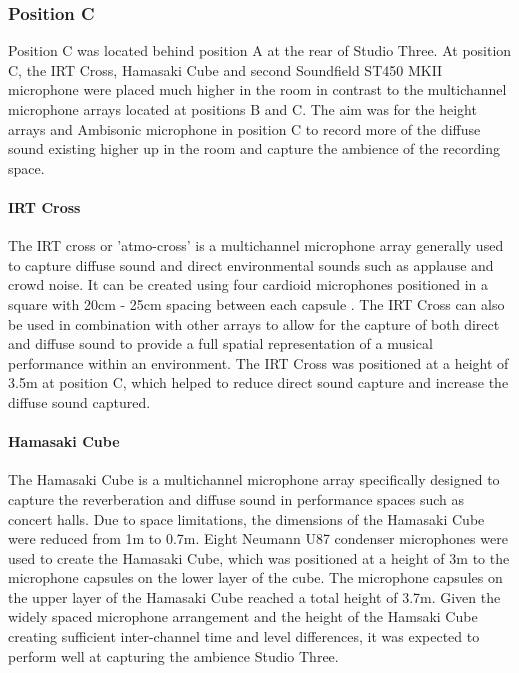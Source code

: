 		\subsubsection{Position C}
			Position C was located behind position A at the rear of Studio Three. At position C, the IRT Cross, Hamasaki Cube and second Soundfield ST450 MKII microphone were placed much higher in the room in contrast to the multichannel microphone arrays located at positions B and C. The aim was for the height arrays and Ambisonic microphone in position C to record more of the diffuse sound existing higher up in the room and capture the ambience of the recording space.\\

			\paragraph{IRT Cross}
			The IRT cross or 'atmo-cross' is a multichannel microphone array generally used to capture diffuse sound and direct environmental sounds such as applause and crowd noise. It can be created using four cardioid microphones positioned in a square with 20cm - 25cm spacing between each capsule \cite{IRTschoeps}. The IRT Cross can also be used in combination with other arrays to allow for the capture of both direct and diffuse sound to provide a full spatial representation of a musical performance within an environment. The IRT Cross was positioned at a height of 3.5m at position C, which helped to reduce direct sound capture and increase the diffuse sound captured.\\


			\paragraph{Hamasaki Cube}
			The Hamasaki Cube is a multichannel microphone array specifically designed to capture the reverberation and diffuse sound in performance spaces such as concert halls. Due to space limitations, the dimensions of the Hamasaki Cube were reduced from 1m to 0.7m. Eight Neumann U87 condenser microphones were used to create the Hamasaki Cube, which was positioned at a height of 3m to the microphone capsules on the lower layer of the cube. The microphone capsules on the upper layer of the Hamasaki Cube reached a total height of 3.7m. Given the widely spaced microphone arrangement and the height of the Hamsaki Cube creating sufficient inter-channel time and level differences, it was expected to perform well at capturing the ambience Studio Three.\\

